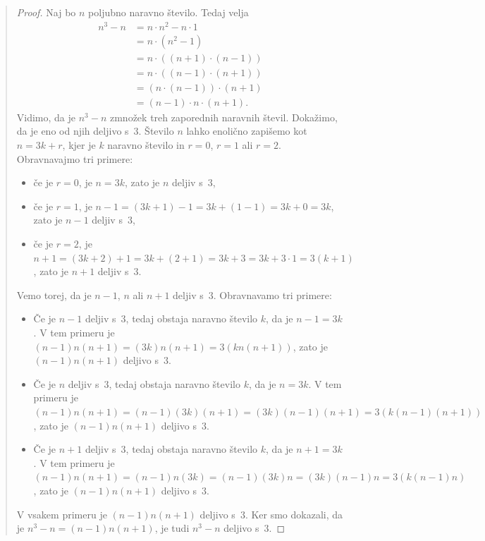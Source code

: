 \begin{quote}
  \begin{proof}
    Naj bo $n$ poljubno naravno število. Tedaj velja
    \begin{align*}
      n^3 - n
      &= n \cdot n^2 - n \cdot 1 \\
      &= n \cdot (n^2 - 1) \\
      &= n \cdot ((n + 1) \cdot (n - 1)) \\
      &= n \cdot ((n - 1) \cdot (n + 1)) \\
      &= (n \cdot (n - 1)) \cdot (n + 1) \\
      &= (n - 1) \cdot n \cdot (n + 1).
    \end{align*}
    Vidimo, da je $n^3 - n$ zmnožek treh zaporednih naravnih števil.
    Dokažimo, da je eno od njih deljivo s~$3$. Število $n$ lahko
    enolično zapišemo kot $n = 3 k + r$, kjer je $k$ naravno število
    in $r = 0$, $r = 1$ ali $r = 2$. Obravnavajmo tri primere:
    \begin{itemize}
    \item če je $r = 0$, je $n = 3 k$, zato je $n$ deljiv s~$3$,
    \item če je $r = 1$, je $n - 1 = (3 k + 1) - 1 = 3 k + (1 - 1) = 3
      k + 0 = 3 k$, zato je $n-1$ deljiv s~$3$,
    \item če je $r = 2$, je $n + 1 = (3 k + 2) + 1 = 3 k + (2 + 1) = 3
      k + 3 = 3 k + 3 \cdot 1 = 3 (k +1)$, zato je $n+1$ deljiv s~$3$.
    \end{itemize}
    Vemo torej, da je $n - 1$, $n$ ali $n + 1$ deljiv s~$3$.
    Obravnavamo tri primere:
    \begin{itemize}
    \item Če je $n - 1$ deljiv s~$3$, tedaj  obstaja naravno število
      $k$, da je $n - 1 = 3 k$. V tem primeru je $(n - 1) n (n + 1) =
      (3 k) n (n + 1) = 3 (k n (n + 1))$, zato je $(n - 1) n (n + 1)$
      deljivo s~$3$.
    \item Če je $n$ deljiv s~$3$, tedaj obstaja naravno število $k$,
      da je $n = 3 k$. V tem primeru je $(n - 1) n (n + 1) = (n - 1)
      (3 k) (n + 1) = (3 k) (n - 1) (n + 1) = 3 (k (n - 1) (n +
      1))$, zato je $(n - 1) n (n + 1)$ deljivo s~$3$.
    \item Če je $n + 1$ deljiv s~$3$, tedaj obstaja naravno število
      $k$, da je $n + 1 = 3 k$. V tem primeru je $(n - 1) n (n + 1) =
      (n - 1) n (3 k) = (n - 1) (3 k) n = (3 k) (n - 1) n = 3 (k (n -
      1) n)$, zato je $(n - 1) n (n + 1)$ deljivo s~$3$.
    \end{itemize}
    V vsakem primeru je $(n - 1) n (n + 1)$ deljivo s~$3$. Ker smo
    dokazali, da je $n^3 - n = (n - 1) n (n + 1)$, je tudi $n^3 - n$
    deljivo s~$3$.
  \end{proof}
\end{quote}

